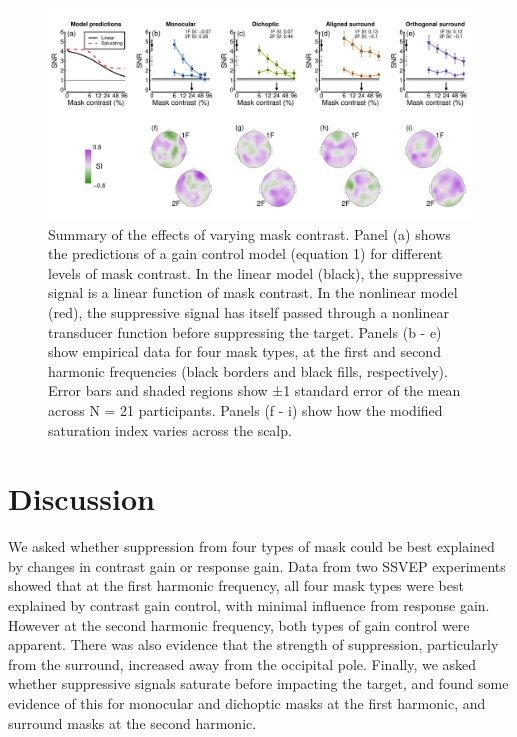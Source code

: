 \documentclass[]{article}
\begin{document}
\begin{figure}

{\centering \includegraphics{figures/masksignals} 

}

\caption{Summary of the effects of varying mask contrast. Panel (a) shows the predictions of a gain control model (equation 1) for different levels of mask contrast. In the linear model (black), the suppressive signal is a linear function of mask contrast. In the nonlinear model (red), the suppressive signal has itself passed through a nonlinear transducer function before suppressing the target. Panels (b - e) show empirical data for four mask types, at the first and second harmonic frequencies (black borders and black fills, respectively). Error bars and shaded regions show ±1 standard error of the mean across N = 21 participants. Panels (f - i) show how the modified saturation index varies across the scalp.}\label{fig:masksignals}
\end{figure}

\hypertarget{discussion}{%
\section{Discussion}\label{discussion}}

We asked whether suppression from four types of mask could be best explained by changes in contrast gain or response gain. Data from two SSVEP experiments showed that at the first harmonic frequency, all four mask types were best explained by contrast gain control, with minimal influence from response gain. However at the second harmonic frequency, both types of gain control were apparent. There was also evidence that the strength of suppression, particularly from the surround, increased away from the occipital pole. Finally, we asked whether suppressive signals saturate before impacting the target, and found some evidence of this for monocular and dichoptic masks at the first harmonic, and surround masks at the second harmonic.
\end{document}
